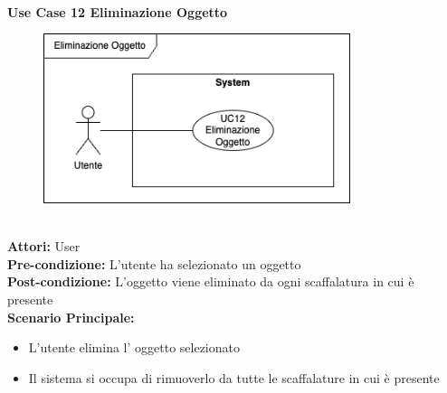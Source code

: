 \Large\textbf{}\\
\Large\textbf{Use Case 12 Eliminazione Oggetto} \\
\begin{figure}[h]
  \centering
  \includegraphics[width=0.8\textwidth]{UseCasesImages/ObjDelete.drawio.png}
\end{figure}
\vspace{0.5cm}

\large\textbf{} \\
\textbf{Attori:} User\\
\textbf{Pre-condizione:} L'utente ha selezionato un oggetto  \\
\textbf{Post-condizione: } L'oggetto viene eliminato da ogni scaffalatura in cui è presente\\
\textbf{Scenario Principale:} 
\begin{itemize}
    \item L'utente elimina l' oggetto selezionato
    \item Il sistema si occupa di rimuoverlo da tutte le scaffalature in cui è presente 
\end{itemize}

\vspace{0.5cm}